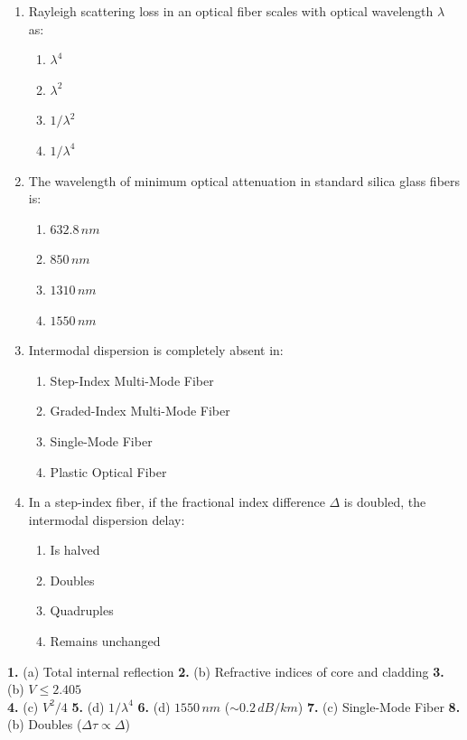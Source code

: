 \begin{enumerate}
    \item Rayleigh scattering loss in an optical fiber scales with optical wavelength $\lambda$ as:
    \begin{enumerate}
        \item $\lambda^4$
        \item $\lambda^2$
        \item $1/\lambda^2$
        \item $1/\lambda^4$
    \end{enumerate}
    
    \item The wavelength of minimum optical attenuation in standard silica glass fibers is:
    \begin{enumerate}
        \item $632.8\,\si{nm}$
        \item $850\,\si{nm}$
        \item $1310\,\si{nm}$
        \item $1550\,\si{nm}$
    \end{enumerate}
    
    \item Intermodal dispersion is completely absent in:
    \begin{enumerate}
        \item Step-Index Multi-Mode Fiber
        \item Graded-Index Multi-Mode Fiber
        \item Single-Mode Fiber
        \item Plastic Optical Fiber
    \end{enumerate}
    
    \item In a step-index fiber, if the fractional index difference $\Delta$ is doubled, the intermodal dispersion delay:
    \begin{enumerate}
        \item Is halved
        \item Doubles
        \item Quadruples
        \item Remains unchanged
    \end{enumerate}
\end{enumerate}

\begin{solutionbox}
\textbf{1.} (a) Total internal reflection \quad \textbar\quad
\textbf{2.} (b) Refractive indices of core and cladding \quad \textbar\quad
\textbf{3.} (b) $V \le 2.405$ \\
\textbf{4.} (c) $V^2 / 4$ \quad \textbar\quad
\textbf{5.} (d) $1/\lambda^4$ \quad \textbar\quad
\textbf{6.} (d) $1550\,\si{nm}$ ($\sim 0.2\,\si{dB/km}$) \quad \textbar\quad
\textbf{7.} (c) Single-Mode Fiber \quad \textbar\quad
\textbf{8.} (b) Doubles ($\Delta \tau \propto \Delta$)
\end{solutionbox}

